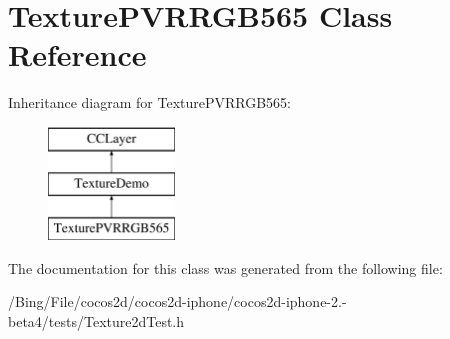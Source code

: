 \hypertarget{interface_texture_p_v_r_r_g_b565}{\section{Texture\-P\-V\-R\-R\-G\-B565 Class Reference}
\label{interface_texture_p_v_r_r_g_b565}
}
Inheritance diagram for Texture\-P\-V\-R\-R\-G\-B565\-:\begin{figure}[H]
\begin{center}
\leavevmode
\includegraphics[height=3.000000cm]{interface_texture_p_v_r_r_g_b565}
\end{center}
\end{figure}


The documentation for this class was generated from the following file\-:\begin{DoxyCompactItemize}
\item 
/\-Bing/\-File/cocos2d/cocos2d-\/iphone/cocos2d-\/iphone-\/2.-\/beta4/tests/Texture2d\-Test.\-h\end{DoxyCompactItemize}
